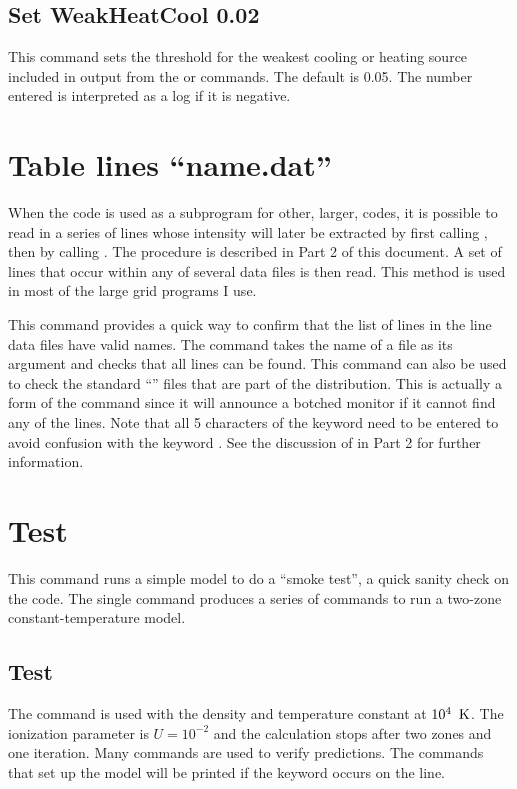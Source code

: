 \subsection{Set WeakHeatCool 0.02}

This command sets the threshold for the weakest cooling or heating source
included in output from the 
or  commands.
The default is 0.05.
The number entered is interpreted as a
log if it is negative.

\section{Table lines ``name.dat''}

When the code is used as a subprogram for other, larger, codes,
it is possible to read in a series of lines whose intensity will
later be extracted
by first calling ,
then by calling .
The procedure is
described in Part 2 of this document.
A set of lines that occur within
any of several data files is then read.
This method is used in most of
the large grid programs I use.

This command provides a quick way to confirm that the list of lines in
the line data files have valid names.
The command takes the name of a file
as its argument and checks that all lines can be found.
This command can also be used to check the standard ``''
files that are part of the distribution.
This is actually a form of the  command since
it will announce a botched monitor if it cannot find any of the lines.
Note that all 5 characters of the keyword  need
to be entered to avoid confusion with the keyword .
See the discussion
of  in Part 2 for further information.

\section{Test}

This command runs a simple model to do a ``smoke test'', 
a quick sanity check on the code.
The single command produces a series of commands to run a two-zone
constant-temperature model.

\subsection{Test}
The  command is used with the density
and temperature constant at $10^4\ {\rm\thinspace K}$.
The ionization parameter is $U = 10^{-2}$ and the
calculation stops after two zones and one iteration.
Many  commands
are used to verify predictions.
The commands that set up the model will
be printed if the keyword  occurs on the line.

